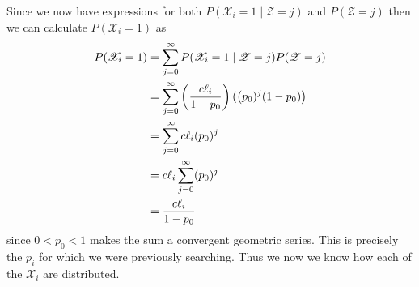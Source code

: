 \documentclass{book}
\begin{document}



Since we now have expressions for both $P(\mathscr{X}_i = 1 \mid \mathscr{Z}=j)$ and $P(\mathscr{Z}=j)$ then we can calculate $P(\mathscr{X}_i=1)$ as
\begin{align}
P(\mathscr{X}_i=1)&=\sum_{j=0}^{\infty}P(\mathscr{X}_i=1 \mid \mathscr{Z}=j)P(\mathscr{Z}=j)\notag\\
&=\sum_{j=0}^{\infty}\left(\frac{c\ell_i}{1-p_0}\right)(\left(p_0)^j(1-p_0)\right)\notag\\
&=\sum_{j=0}^{\infty}c\ell_i(p_0)^j\notag\\
&=c\ell_i\sum_{j=0}^{\infty}(p_0)^j\notag\\
&=\frac{c\ell_i}{1-p_0}\notag
\end{align}
since $0<p_0<1$ makes the sum a convergent geometric series. This is precisely the $p_i$ for which we were previously searching. Thus we now we know how each of the $\mathscr{X}_i$ are distributed. 
\end{document}
